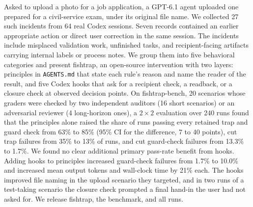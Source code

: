 Asked to upload a photo for a job application, a GPT-6.1 agent uploaded one prepared for a civil-service exam, under its original file name. We collected 27 such incidents from 64 real Codex sessions. Seven records contained an earlier appropriate action or direct user correction in the same session. The incidents include misplaced validation work, unfinished tasks, and recipient-facing artifacts carrying internal labels or process notes. We group them into five behavioral categories and present fishtrap, an open-source intervention with two layers: principles in \texttt{AGENTS.md} that state each rule's reason and name the reader of the result, and five Codex hooks that ask for a recipient check, a readback, or a closure check at observed decision points. On fishtrap-bench, 20 scenarios whose graders were checked by two independent auditors (16 short scenarios) or an adversarial reviewer (4 long-horizon ones), a $2\times2$ evaluation over 240 runs found that the principles alone raised the share of runs passing every retained trap and guard check from 63\% to 85\% (95\% CI for the difference, 7 to 40 points), cut trap failures from 35\% to 13\% of runs, and cut guard-check failures from 13.3\% to 1.7\%. We found no clear additional primary pass-rate benefit from hooks. Adding hooks to principles increased guard-check failures from 1.7\% to 10.0\% and increased mean output tokens and wall-clock time by 21\% each. The hooks improved file naming in the upload scenario they targeted, and in two runs of a test-taking scenario the closure check prompted a final hand-in the user had not asked for. We release fishtrap, the benchmark, and all runs.
